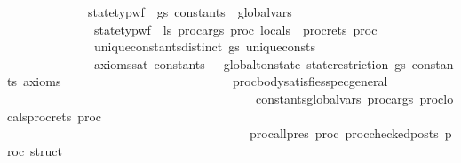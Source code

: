 \begin{isabellebody}
\ \ \ \ \ \ \ \ \ \ \ \ \ {\isacharparenleft}{\kern0pt}state{\isacharunderscore}{\kern0pt}typ{\isacharunderscore}{\kern0pt}wf\ {\isasymOmega}\ gs\ {\isacharparenleft}{\kern0pt}constants\ {\isacharat}{\kern0pt}\ global{\isacharunderscore}{\kern0pt}vars{\isacharparenright}{\kern0pt}\ {\isasymlongrightarrow}\isanewline
\ \ \ \ \ \ \ \ \ \ \ \ \ \ state{\isacharunderscore}{\kern0pt}typ{\isacharunderscore}{\kern0pt}wf\ {\isasymOmega}\ ls\ {\isacharparenleft}{\kern0pt}{\isacharparenleft}{\kern0pt}proc{\isacharunderscore}{\kern0pt}args\ proc{\isacharparenright}{\kern0pt}{\isacharat}{\kern0pt}\ {\isacharparenleft}{\kern0pt}locals\ {\isacharat}{\kern0pt}\ proc{\isacharunderscore}{\kern0pt}rets\ proc{\isacharparenright}{\kern0pt}{\isacharparenright}{\kern0pt}\ {\isasymlongrightarrow}\isanewline
\ \ \ \ \ \ \ \ \ \ \ \ \ \ unique{\isacharunderscore}{\kern0pt}constants{\isacharunderscore}{\kern0pt}distinct\ gs\ unique{\isacharunderscore}{\kern0pt}consts\ {\isasymlongrightarrow}\isanewline
\ \ \ \ \ \ \ \ \ \ \ \ \ \ {\isacharparenleft}{\kern0pt}axioms{\isacharunderscore}{\kern0pt}sat\ {\isacharparenleft}{\kern0pt}constants{\isacharcomma}{\kern0pt}\ {\isacharbrackleft}{\kern0pt}{\isacharbrackright}{\kern0pt}{\isacharparenright}{\kern0pt}\ {\isasymGamma}\ {\isacharparenleft}{\kern0pt}global{\isacharunderscore}{\kern0pt}to{\isacharunderscore}{\kern0pt}nstate\ {\isacharparenleft}{\kern0pt}state{\isacharunderscore}{\kern0pt}restriction\ gs\ constants{\isacharparenright}{\kern0pt}{\isacharparenright}{\kern0pt}\ axioms{\isacharparenright}{\kern0pt}\ {\isasymlongrightarrow}\ \ \ \ \ \ \ \ \ \ \ \ \isanewline
\ \ \ \ \ \ \ \ \ \ \ \ \ \ {\isacharparenleft}{\kern0pt}proc{\isacharunderscore}{\kern0pt}body{\isacharunderscore}{\kern0pt}satisfies{\isacharunderscore}{\kern0pt}spec{\isacharunderscore}{\kern0pt}general\ \isanewline
\ \ \ \ \ \ \ \ \ \ \ \ \ \ \ \ \ \ \ \ \ \ \ \ \ \ \ \ \ \ \ \ \ \ \ \ \ \ \ {\isacharbrackleft}{\kern0pt}{\isacharbrackright}{\kern0pt}\ {\isacharparenleft}{\kern0pt}constants{\isacharat}{\kern0pt}global{\isacharunderscore}{\kern0pt}vars{\isacharcomma}{\kern0pt}\ {\isacharparenleft}{\kern0pt}proc{\isacharunderscore}{\kern0pt}args\ proc{\isacharparenright}{\kern0pt}{\isacharat}{\kern0pt}{\isacharparenleft}{\kern0pt}locals{\isacharat}{\kern0pt}{\isacharparenleft}{\kern0pt}proc{\isacharunderscore}{\kern0pt}rets\ proc{\isacharparenright}{\kern0pt}{\isacharparenright}{\kern0pt}{\isacharparenright}{\kern0pt}\ {\isasymGamma}\ {\isasymOmega}\isanewline
\ \ \ \ \ \ \ \ \ \ \ \ \ \ \ \ \ \ \ \ \ \ \ \ \ \ \ \ \ \ \ \ \ \ \ \ \ \ \ {\isacharparenleft}{\kern0pt}proc{\isacharunderscore}{\kern0pt}all{\isacharunderscore}{\kern0pt}pres\ proc{\isacharparenright}{\kern0pt}\ {\isacharparenleft}{\kern0pt}proc{\isacharunderscore}{\kern0pt}checked{\isacharunderscore}{\kern0pt}posts\ proc{\isacharparenright}{\kern0pt}\ struct\isanewline

\end{isabellebody}
